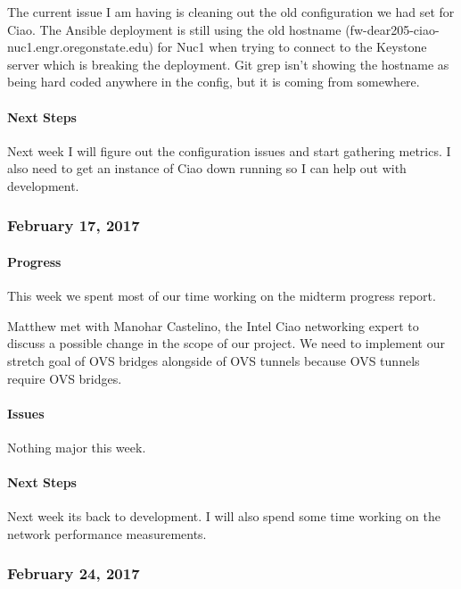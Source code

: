 \documentclass[10pt,onecolumn,journal,draftclsnofoot]{IEEEtran}
\begin{document}
The current issue I am having is cleaning out the old configuration we
had set for Ciao. The Ansible deployment is still using the old hostname
(fw-dear205-ciao-nuc1.engr.oregonstate.edu) for Nuc1 when trying to
connect to the Keystone server which is breaking the deployment. Git
grep isn't showing the hostname as being hard coded anywhere in the
config, but it is coming from somewhere.

\paragraph{Next Steps} 

Next week I will figure out the configuration issues and start gathering
metrics. I also need to get an instance of Ciao down running so I can
help out with development.

\subsubsection{February 17, 2017} 

\paragraph{Progress} 

This week we spent most of our time working on the midterm progress
report.

Matthew met with Manohar Castelino, the Intel Ciao networking expert to
discuss a possible change in the scope of our project. We need to
implement our stretch goal of OVS bridges alongside of OVS tunnels
because OVS tunnels require OVS bridges.

\paragraph{Issues} 

Nothing major this week.

\paragraph{Next Steps} 

Next week its back to development. I will also spend some time working
on the network performance measurements.

\subsubsection{February 24, 2017} 
\end{document}
